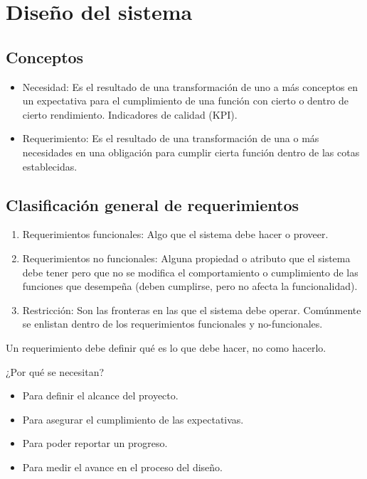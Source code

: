 \section{Diseño del sistema}

\subsection{Conceptos}

\begin{itemize}
    \item Necesidad: Es el resultado de una transformación de uno a más conceptos en un expectativa para el cumplimiento de una función con cierto o dentro de cierto rendimiento. Indicadores de calidad (KPI).
    
    \item Requerimiento: Es el resultado de una transformación de una o más necesidades en una obligación para cumplir cierta función dentro de las cotas establecidas.
\end{itemize}

 \subsection{Clasificación general de requerimientos}
 \begin{enumerate}
     \item Requerimientos funcionales: Algo que el sistema debe hacer o proveer.
     
     \item Requerimientos no funcionales: Alguna propiedad o atributo que el sistema debe tener pero que no se modifica el comportamiento o cumplimiento de las funciones que desempeña (deben cumplirse, pero no afecta la funcionalidad).
     
     \item Restricción: Son las fronteras en las que el sistema debe operar. Comúnmente se enlistan dentro de los requerimientos funcionales y no-funcionales. 
 \end{enumerate}
 
 Un requerimiento debe definir qué es lo que debe hacer, no como hacerlo.
 
 ¿Por qué se necesitan?
 \begin{itemize}
     \item Para definir el alcance del proyecto.
     
     \item Para asegurar el cumplimiento de las expectativas.
     
     \item Para poder reportar un progreso.
     
     \item Para medir el avance en el proceso del diseño.
 \end{itemize}
 
